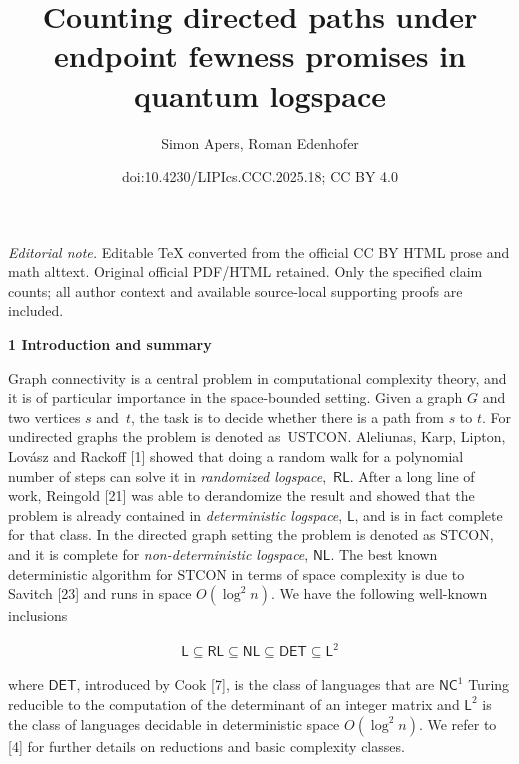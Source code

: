 \documentclass[10pt,a4paper]{article}
\title{Counting directed paths under endpoint fewness promises in quantum logspace}
\author{Simon Apers, Roman Edenhofer}
\date{doi:10.4230/LIPIcs.CCC.2025.18; CC BY 4.0}
\begin{document}
\maketitle
\noindent\textit{Editorial note.} Editable TeX converted from the official CC BY HTML prose and math alttext. Original official PDF/HTML retained. Only the specified claim counts; all author context and available source-local supporting proofs are included.\par\medskip


\par\medskip\noindent\textbf{
1 Introduction and summary}\par




Graph connectivity is a central problem in computational complexity theory, and it is of particular importance in the space-bounded setting.
Given a graph $G$ and two vertices $s$ and $t$, the task is to decide whether there is a path from $s$ to $t$.
For undirected graphs the problem is denoted as $\mathrm{USTCON}$. Aleliunas, Karp, Lipton, Lovász and Rackoff [1] showed that doing a random walk for a polynomial number of steps can solve it in \emph{randomized logspace}, $\mathsf{RL}$. After a long line of work, Reingold [21] was able to derandomize the result and showed that the problem is already contained in \emph{deterministic logspace}, $\mathsf{L}$, and is in fact complete for that class.
In the directed graph setting the problem is denoted as $\mathrm{STCON}$, and it is complete for \emph{non-deterministic logspace}, $\mathsf{NL}$. The best known deterministic algorithm for $\mathrm{STCON}$ in terms of space complexity is due to Savitch [23] and runs in space $O(\log^{2}n)$.
We have the following well-known inclusions\par


\[\begin{gathered}
\displaystyle\mathsf{L}\subseteq\mathsf{RL}\subseteq\mathsf{NL}\subseteq\mathsf{DET}\subseteq\mathsf{L}^{2}
\end{gathered}\]


where $\mathsf{DET}$, introduced by Cook [7], is the class of languages that are $\mathsf{NC}^{1}$ Turing reducible to the computation of the determinant of an integer matrix and $\mathsf{L}^{2}$ is the class of languages decidable in deterministic space $O(\log^{2}n)$.
We refer to [4] for further details on reductions and basic complexity classes.\par
\end{document}
